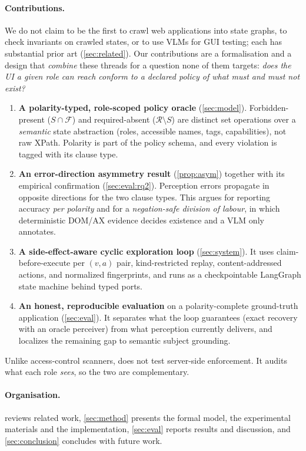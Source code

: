 \paragraph{Contributions.}
We do not claim to be the first to crawl web applications into state graphs,
to check invariants on crawled states, or to use VLMs for GUI testing; each has
substantial prior art (\cref{sec:related}). Our contributions are a
formalisation and a design that \emph{combine} these threads for a question
none of them targets: \emph{does the UI a given role can reach conform to a
declared policy of what must and must not exist?}
\begin{enumerate}
  \item \textbf{A polarity-typed, role-scoped policy oracle}
    (\cref{sec:model}). Forbidden-present ($S\cap\mathcal F$) and
    required-absent ($\mathcal R\setminus S$) are distinct set operations over
    a \emph{semantic} state abstraction (roles, accessible names, tags,
    capabilities), not raw XPath. Polarity is part of the policy schema, and
    every violation is tagged with its clause type.
  \item \textbf{An error-direction asymmetry result}
    (\cref{prop:asym}) together with its empirical confirmation
    (\cref{sec:eval:rq2}). Perception errors propagate in opposite directions
    for the two clause types. This argues for reporting accuracy \emph{per
    polarity} and for a \emph{negation-safe division of labour}, in which
    deterministic DOM/AX evidence decides existence and a VLM only annotates.
  \item \textbf{A side-effect-aware cyclic exploration loop}
    (\cref{sec:system}). It uses claim-before-execute per $(v,a)$ pair,
    kind-restricted replay, content-addressed actions, and normalized
    fingerprints, and runs as a checkpointable LangGraph state machine behind
    typed ports.
  \item \textbf{An honest, reproducible evaluation} on a polarity-complete
    ground-truth application (\cref{sec:eval}). It separates what the loop
    guarantees (exact recovery with an oracle perceiver) from what perception
    currently delivers, and localizes the remaining gap to semantic subject
    grounding.
\end{enumerate}

Unlike access-control scanners, \sys{} does not test server-side enforcement.
It audits what each role \emph{sees}, so the two are complementary.

\paragraph{Organisation.}
 reviews related work, \cref{sec:method} presents the
formal model, the experimental materials and the implementation,
\cref{sec:eval} reports results and discussion, and \cref{sec:conclusion}
concludes with future work.
